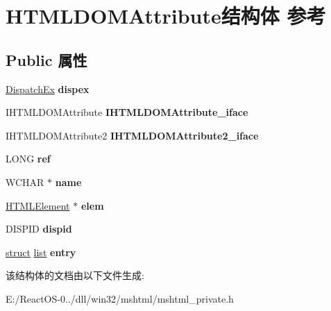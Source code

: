 \hypertarget{struct_h_t_m_l_d_o_m_attribute}{}\section{H\+T\+M\+L\+D\+O\+M\+Attribute结构体 参考}
\label{struct_h_t_m_l_d_o_m_attribute}
\subsection*{Public 属性}
\begin{DoxyCompactItemize}
\item 
\mbox{\label{struct_h_t_m_l_d_o_m_attribute_ab9c204d2d7361546a9f2e695ad3238ed}} 
\hyperlink{struct_dispatch_ex}{Dispatch\+Ex} {\bfseries dispex}
\item 
\mbox{\label{struct_h_t_m_l_d_o_m_attribute_a5531629cd428d570dc2f073f267061c6}} 
I\+H\+T\+M\+L\+D\+O\+M\+Attribute {\bfseries I\+H\+T\+M\+L\+D\+O\+M\+Attribute\+\_\+iface}
\item 
\mbox{\label{struct_h_t_m_l_d_o_m_attribute_a48590bd84e0f8f06835055335d521f2d}} 
I\+H\+T\+M\+L\+D\+O\+M\+Attribute2 {\bfseries I\+H\+T\+M\+L\+D\+O\+M\+Attribute2\+\_\+iface}
\item 
\mbox{\label{struct_h_t_m_l_d_o_m_attribute_ab5c804dca5799de75b0275543a2f2750}} 
L\+O\+NG {\bfseries ref}
\item 
\mbox{\label{struct_h_t_m_l_d_o_m_attribute_aa0a126639c58d31103ca6ee9ef097b84}} 
W\+C\+H\+AR $\ast$ {\bfseries name}
\item 
\mbox{\label{struct_h_t_m_l_d_o_m_attribute_a5fea8b16c1720561eef2f75b72f1b076}} 
\hyperlink{struct_h_t_m_l_element}{H\+T\+M\+L\+Element} $\ast$ {\bfseries elem}
\item 
\mbox{\label{struct_h_t_m_l_d_o_m_attribute_a28544925c78d734651c6af7dd70970b1}} 
D\+I\+S\+P\+ID {\bfseries dispid}
\item 
\mbox{\label{struct_h_t_m_l_d_o_m_attribute_ab7f709977eb0eb66499ca09d8b512774}} 
\hyperlink{interfacestruct}{struct} \hyperlink{classlist}{list} {\bfseries entry}
\end{DoxyCompactItemize}


该结构体的文档由以下文件生成\+:\begin{DoxyCompactItemize}
\item 
E\+:/\+React\+O\+S-\/0../dll/win32/mshtml/mshtml\+\_\+private.\+h\end{DoxyCompactItemize}

